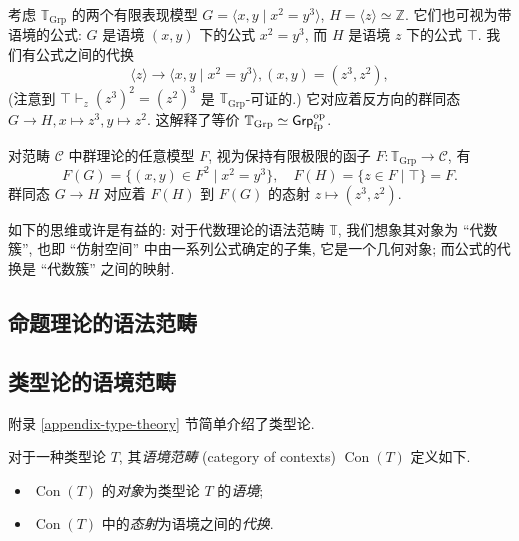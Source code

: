 \begin{example}
	{}
	考虑 $\mathbb T_{\text{Grp}}$ 的两个有限表现模型 $G = \langle x,y\mid x^2=y^3 \rangle$, $H = \langle z \rangle \simeq \mathbb{Z}$. 它们也可视为带语境的公式: $G$ 是语境 $(x,y)$ 下的公式 $x^2=y^3$, 而 $H$ 是语境 $z$ 下的公式 $\top$.
	我们有公式之间的代换 $$\langle z \rangle \to \langle x,y\mid x^2=y^3 \rangle, (x,y)=(z^3,z^2),$$
	(注意到 $\top\vdash_{z} (z^3)^2=(z^2)^3$ 是 $\mathbb T_{\text{Grp}}$-可证的.) 它对应着反方向的群同态 $G\to H, x\mapsto z^3, y\mapsto z^2$. 这解释了等价 $\mathbb T_{\text{Grp}}\simeq \mathsf{Grp}_{\text{fp}}^{\text{op}}$.
	
	对范畴 $\mathcal C$ 中群理论的任意模型 $F$, 视为保持有限极限的函子 $F\colon \mathbb T_{\text{Grp}}\to \mathcal C$,
	有
	$$
	F(G) = \{(x,y)\in F^2\mid x^2=y^3\},\quad
	F(H) = \{z\in F\mid\top\} =F.
	$$
	群同态 $G\to H$ 对应着 $F(H)$ 到 $F(G)$ 的态射 $z\mapsto (z^3,z^2)$.
\end{example}

\begin{remark}
	{}
	如下的思维或许是有益的: 对于代数理论的语法范畴 $\mathbb T$, 我们想象其对象为 ``代数簇'', 也即 ``仿射空间'' 中由一系列公式确定的子集, 它是一个几何对象; 而公式的代换是 ``代数簇'' 之间的映射.
\end{remark}

\subsection{命题理论的语法范畴}



\subsection{类型论的语境范畴}

附录 \ref{appendix-type-theory} 节简单介绍了类型论.

\begin{definition}
	{}
	对于一种类型论 $T$, 其\emph{语境范畴} (category of contexts) $\operatorname{Con}(T)$ 定义如下.
	\begin{itemize}
		\item $\operatorname{Con}(T)$ 的\emph{对象}为类型论 $T$ 的\emph{语境};
		\item $\operatorname{Con}(T)$ 中的\emph{态射}为语境之间的\emph{代换}.
	\end{itemize}
\end{definition}

